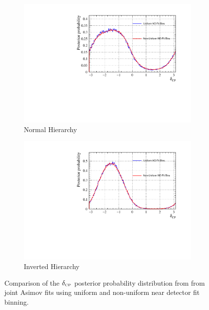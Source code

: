\begin{figure}[!htbp]
\centering
\begin{subfigure}{.7\textwidth}
  \centering
  \includegraphics[width=0.95\linewidth]{figs/compMaCh3Contours_TH2DvsTHPoly_asimov/compMaCh3Contours_TH2DvsTHPoly_dcp_asimovA_NH}
  \caption{Normal Hierarchy}
  \label{fig:TH2DPolydcpNH}
\end{subfigure}
\begin{subfigure}{.7\textwidth}
  \centering
  \includegraphics[width=0.95\linewidth]{figs/compMaCh3Contours_TH2DvsTHPoly_asimov/compMaCh3Contours_TH2DvsTHPoly_dcp_asimovA_IH}
  \caption{Inverted Hierarchy}
  \label{fig:TH2DPolydcpIH}
\end{subfigure}
\caption{Comparison of the $\delta_{\scriptscriptstyle\mathrm{CP}}$ posterior probability distribution from from joint Asimov fits using uniform and non-uniform near detector fit binning.}
\label{fig:TH2DPolydcp}
\end{figure}


